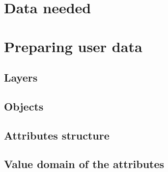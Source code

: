 \documentclass[a4paper, 12pt]{article}
\begin{document}
\section{Data needed}

\section{Preparing user data}

\subsection{Layers}

\subsection{Objects}

\subsection{Attributes structure}

\subsection{Value domain of the attributes}
\end{document}
